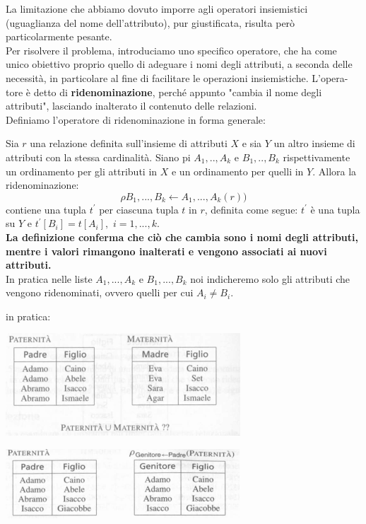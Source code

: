 \documentclass[a4paper,12pt, oneside]{book}
\begin{document}
La limitazione che abbiamo dovuto imporre agli operatori insiemistici
(uguaglianza del nome dell'attributo), pur giustificata, risulta però particolarmente pesante.\\
Per risolvere il problema, introduciamo uno specifico operatore, che ha come
unico obiettivo proprio quello di adeguare i nomi degli attributi, a seconda delle
necessità, in particolare al fine di facilitare le operazioni insiemistiche. L'opera-
tore è detto di \textbf{ridenominazione}, perché appunto "cambia il nome degli attributi",
lasciando inalterato il contenuto delle relazioni.\\
Definiamo l'operatore di ridenominazione in forma generale:
\begin{descrizione}
Sia $r$ una relazione definita sull'insieme di attributi $X$ e sia $Y$ un altro
insieme di attributi con la stessa cardinalità.
Siano pi $A_1,..,A_k$ e $B_1,..,B_k$ rispettivamente un ordinamento per
gli attributi in $X$ e un ordinamento per quelli in $Y$. Allora la ridenominazione:
\[\rho B_1, ..., B_k \leftarrow A_1, ..., A_k(r))\]
contiene una tupla $t^{'}$ per ciascuna tupla $t$ in $r$, definita come segue:
$t^{'}$ è una tupla su $Y$ e $t^{'}[B_i]=t[A_i],\,\,i=1,...,k$.\\
\textbf{La definizione conferma che ciò che cambia sono i nomi degli attributi,
  mentre i valori rimangono inalterati e vengono associati ai nuovi attributi.}\\
In pratica nelle liste $A_1,...,A_k$ e $B_1, ..., B_k$ noi indicheremo solo gli attributi che vengono ridenominati, ovvero quelli per cui $A_i\neq B_i$.
\end{descrizione}
in pratica:
\begin{center}
\includegraphics[scale=1]{img/alg1.png}
\end{center}
\begin{center}
\includegraphics[scale=1]{img/alg2.png}
\end{center}
\end{document}
